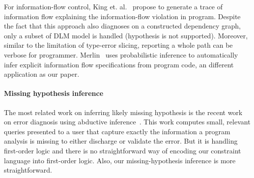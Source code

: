 For information-flow control, King et. al.~\cite{king:fse} propose to
generate a trace of information flow explaining the information-flow violation
in program. Despite the fact that this approach also diagnoses on a constructed
dependency graph, only a subset of DLM model is handled (hypothesis is not
supported). Moreover, similar to the limitation of type-error slicing,
reporting a whole path can be verbose for programmer.
Merlin~\cite{livshits:merlin} uses probabilistic inference to automatically
infer explicit information flow specifications from program code, an different
application as our paper.

\paragraph{Missing hypothesis inference}

The most related work on inferring likely missing hypothesis is the recent work
on error diagnosis using abductive inference~\cite{dillig:pldi12}. This work
computes small, relevant queries presented to a user that capture exactly the
information a program analysis is missing to either discharge or validate the
error. But it is handling first-order logic and there is no straightforward way
of encoding our constraint language into first-order logic. Also, our
missing-hypothesis inference is more straightforward.






